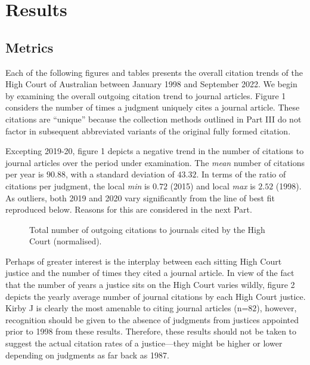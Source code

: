 \let\xn\xnote
\section{Results}


\subsection{Metrics}

Each of the following figures and tables presents the overall citation trends of the High Court of Australian between January 1998 and September 2022. We begin by examining the overall outgoing citation trend to journal articles. Figure 1 considers the number of times a judgment uniquely cites a journal article. These citations are ``unique'' because the collection methods outlined in Part III do not factor in subsequent abbreviated variants of the original fully formed citation.

Excepting 2019-20, figure 1 depicts a negative trend in the number of citations to journal articles over the period under examination. The \emph{mean} number of citations per year is $90.88$, with a standard deviation of $43.32$. In terms of the ratio of citations per judgment, the local \emph{min} is $0.72$ (2015) and local \emph{max} is $2.52$ (1998). As outliers, both 2019 and 2020 vary significantly from the line of best fit reproduced below. Reasons for this are considered in the next Part.

\begin{figure}[!htpb]
    \centering
    \makebox[\textwidth][c]{}
    \caption{Total number of outgoing citations to journals cited by the High Court (normalised).}
\end{figure}

Perhaps of greater interest is the interplay between each sitting High Court justice and the number of times they cited a journal article. In view of the fact that the number of years a justice sits on the High Court varies wildly, figure 2 depicts the yearly average number of journal citations by each High Court justice. Kirby J is clearly the most amenable to citing journal articles (n=$82$), however, recognition should be given to the absence of judgments from justices appointed prior to 1998 from these results.\xn{5-1} Therefore, these results should not be taken to suggest the actual citation rates of a justice---they might be higher or lower depending on judgments as far back as 1987.


